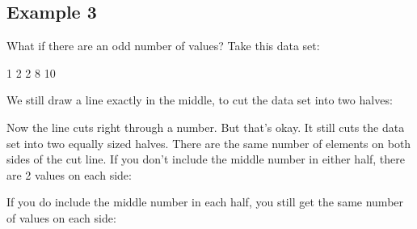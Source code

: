 \documentclass[../../../main.tex]{subfiles}
\begin{document}
\subsection{Example 3} 

What if there are an odd number of values? Take this data set:

\begin{center}
  1 2 2 8 10
\end{center}

\noindent
We still draw a line exactly in the middle, to cut the data set into two halves:

\begin{center}
\end{center}

\noindent
Now the line cuts right through a number. But that's okay. It still cuts the data set into two equally sized halves. There are the same number of elements on both sides of the cut line. If you don't include the middle number in either half, there are 2 values on each side:

\begin{center}
\end{center}

\noindent
If you do include the middle number in each half, you still get the same number of values on each side:
\end{document}
